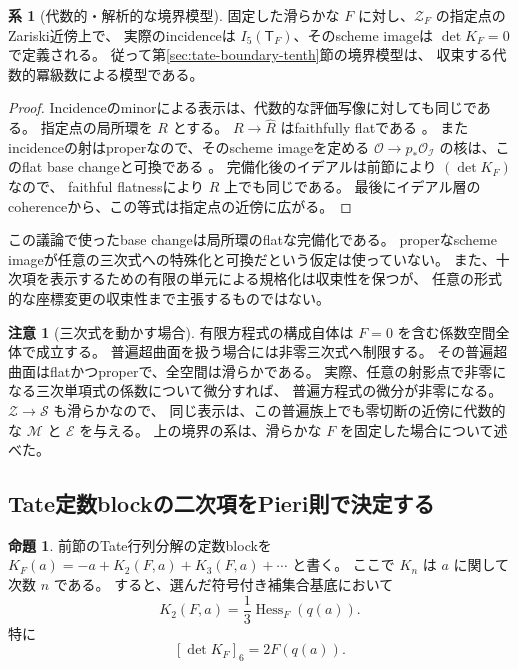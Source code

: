 \documentclass[a4paper,11pt]{ltjsarticle}
\theoremstyle{definition}
\newtheorem{remark}[theorem]{注意}
\newtheorem{proposition}[theorem]{命題}
\newtheorem{corollary}[theorem]{系}
\newcommand{\OO}{\mathcal O}
\begin{document}
\begin{corollary}[代数的・解析的な境界模型]
\label{cor:algebraic-analytic-tate-boundary}
固定した滑らかな $F$ に対し、$\mathcal Z_F$ の指定点のZariski近傍上で、
実際のincidenceは $I_5(\mathsf T_F)$、そのscheme imageは
$\det K_F=0$ で定義される。
従って第\ref{sec:tate-boundary-tenth}節の境界模型は、
収束する代数的冪級数による模型である。
\end{corollary}
\begin{proof}
Incidenceのminorによる表示は、代数的な評価写像に対しても同じである。
指定点の局所環を $R$ とする。
$R\to\widehat R$ はfaithfully flatである
\cite[Lemma 10.97.3, Tag 00MC]{StacksFaithfulCompletion}。
またincidenceの射はproperなので、そのscheme imageを定める
$\OO\to p_*\OO_{\mathcal I}$ の核は、このflat base changeと可換である
\cite[Lemma 30.5.2, Tag 02KH]{StacksFlatBaseChange}。
完備化後のイデアルは前節により $(\det K_F)$ なので、
faithful flatnessにより $R$ 上でも同じである。
最後にイデアル層のcoherenceから、この等式は指定点の近傍に広がる。
\end{proof}

この議論で使ったbase changeは局所環のflatな完備化である。
properなscheme imageが任意の三次式への特殊化と可換だという仮定は使っていない。
また、十次項を表示するための有限の単元による規格化は収束性を保つが、
任意の形式的な座標変更の収束性まで主張するものではない。

\begin{remark}[三次式を動かす場合]
有限方程式の構成自体は $F=0$ を含む係数空間全体で成立する。
普遍超曲面を扱う場合には非零三次式へ制限する。
その普遍超曲面はflatかつproperで、全空間は滑らかである。
実際、任意の射影点で非零になる三次単項式の係数について微分すれば、
普遍方程式の微分が非零になる。
$\mathcal Z\to\mathcal S$ も滑らかなので、
同じ表示は、この普遍族上でも零切断の近傍に代数的な $\mathcal M$ と
$\mathcal E$ を与える。
上の境界の系は、滑らかな $F$ を固定した場合について述べた。
\end{remark}

\subsection{Tate定数blockの二次項をPieri則で決定する}
\label{subsec:v9-tate-second-block}

\begin{proposition}\label{prop:v9-K2-hessian}
前節のTate行列分解の定数blockを
$K_F(a)=-a+K_2(F,a)+K_3(F,a)+\cdots$ と書く。
ここで $K_n$ は $a$ に関して次数 $n$ である。
すると、選んだ符号付き補集合基底において
\[
                     K_2(F,a)=\frac13\operatorname{Hess}_F(q(a)).
\]
特に
\[
                    [\det K_F]_6=2F(q(a)).
\]
\end{proposition}
\end{document}
